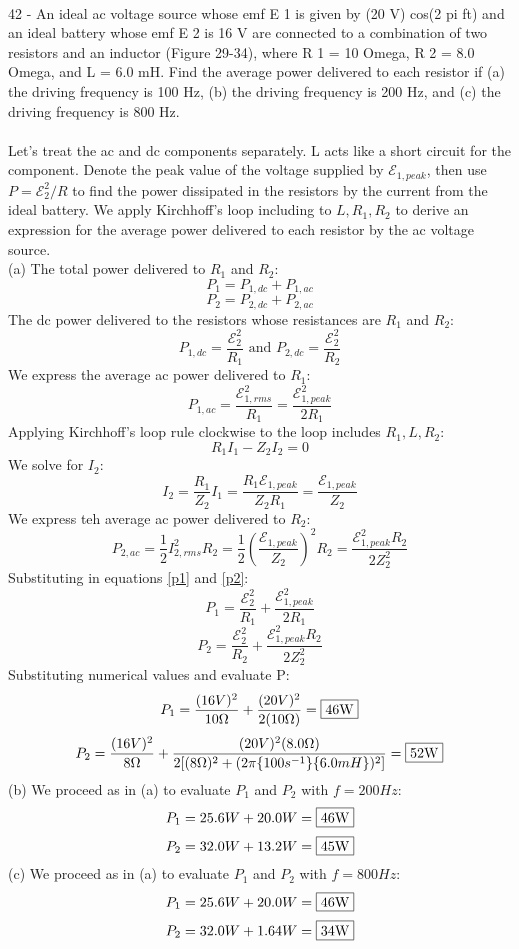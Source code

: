 \documentclass{report}
\begin{document}
\paragraph{}
42 - An ideal ac voltage source whose emf E 1 is given by (20 V) cos(2 pi ft) and an ideal battery whose emf E 2 is 16 V are connected to a combination of two resistors and an inductor (Figure 29-34), where R 1 = 10 Omega, R 2 = 8.0 Omega, and L = 6.0 mH. Find the average power delivered to each resistor if (a) the driving frequency is 100 Hz, (b) the driving frequency is 200 Hz, and (c) the driving frequency is 800 Hz.\\
\\
Let's treat the ac and dc components separately. L acts like a short circuit for the component. Denote the peak value of the voltage supplied by $\mathcal{E}_{1,peak}$, then use $P = \mathcal{E}_2^2 / R$ to find the power dissipated in the resistors by the current from the ideal battery. We apply Kirchhoff's loop including to $L, R_1, R_2$ to derive an expression for the average power delivered to each resistor by the ac voltage source.\\
(a) The total power delivered to $R_1$ and $R_2$:
\begin{equation} \label{p1}
  P_1 = P_{1,dc} + P_{1,ac}
\end{equation}
\begin{equation} \label{p2}
  P_2 = P_{2,dc} + P_{2,ac}
\end{equation}
The dc power delivered to the resistors whose resistances are $R_1$ and $R_2$:
$$P_{1,dc} = \frac{\mathcal{E}_2^2}{R_1} \text{ and } P_{2,dc} = \frac{\mathcal{E}_2^2}{R_2}$$
We express the average ac power delivered to $R_1$:
$$P_{1,ac} = \frac{\mathcal{E}_{1,rms}^2}{R_1} = \frac{\mathcal{E}_{1,peak}^2}{2R_1}$$
Applying Kirchhoff's loop rule clockwise to the loop includes $R_1, L, R_2$:
$$R_1I_1 - Z_2I_2 = 0$$
We solve for $I_2$:
$$I_2 = \frac{R_1}{Z_2}I_1 = \frac{R_1 \mathcal{E}_{1,peak}}{Z_2R_1} = \frac{\mathcal{E}_{1,peak}}{Z_2}$$
We express teh average ac power delivered to $R_2$:
$$P_{2,ac} = \frac{1}{2}I_{2,rms}^2R_2 = \frac{1}{2}\left( \frac{\mathcal{E}_{1,peak}}{Z_2} \right)^2 R_2 = \frac{\mathcal{E}_{1,peak}^2 R_2}{2Z_2^2}$$
Substituting in equations \ref{p1} and \ref{p2}: 
$$P_1 = \frac{\mathcal{E}_2^2}{R_1} + \frac{\mathcal{E}_{1,peak}^2}{2R_1}$$
$$P_2 = \frac{\mathcal{E}_2^2}{R_2} + \frac{\mathcal{E}_{1,peak}^2 R_2}{2Z_2^2}$$
Substituting numerical values and evaluate P:
$$P_1 = \frac{(16V)^2}{10\Omega} + \frac{(20V)^2}{2(10\Omega)} = \fbox{46W}$$
$$P_2 = \frac{(16V)^2}{8\Omega} + \frac{(20V)^2(8.0\Omega)}{2[(8\Omega)^2 + (2\pi \{100s^{-1}\}\{6.0mH\})^2]} = \fbox{52W}$$
(b) We proceed as in (a) to evaluate $P_1$ and $P_2$ with $f = 200 Hz$:
$$P_1 = 25.6W + 20.0W = \fbox{46W}$$
$$P_2 = 32.0W + 13.2W = \fbox{45W}$$
(c) We proceed as in (a) to evaluate $P_1$ and $P_2$ with $f = 800 Hz$:
$$P_1 = 25.6W + 20.0W = \fbox{46W}$$
$$P_2 = 32.0W + 1.64W = \fbox{34W}$$
\end{document}
